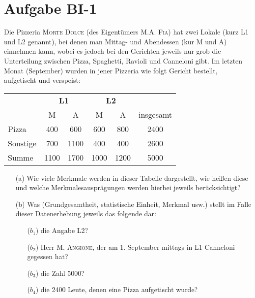 
\section{Aufgabe BI-1}

\begin{task}
    Die Pizzeria \textsc{Morte Dolce} (des Eigentümers \textsc{M.A. Fia}) hat zwei Lokale (kurz L1 und L2 genannt), bei denen man Mittag- und Abendessen (kur M und A) einnehmen kann, wobei es jedoch bei den Gerichten jeweils nur grob die Unterteilung zwischen Pizza, Spaghetti, Ravioli und Canneloni gibt. Im letzten Monat (September) wurden in jener Pizzeria wie folgt Gericht bestellt, aufgetischt und verspeist:

    \begin{table}[H]
    \begin{tabular}{l||cc|cc||c}
        \multirow{2}{*}{} & \multicolumn{2}{c|}{\bf{L1}}  & \multicolumn{2}{c||}{\bf{L2}} &                         \\
                          & \multicolumn{1}{c}{M}         & A    & \multicolumn{1}{c}{M}  & A           & insgesamt \\ \hline\hline
        Pizza             & \multicolumn{1}{c}{400}       & 600  & 600                    & 800         & 2400      \\
        Sonstige          & \multicolumn{1}{c}{700}       & 1100 & 400                    & 400         & 2600      \\
        Summe             & \multicolumn{1}{c}{1100}      & 1700 & 1000                   & 1200        & 5000     
    \end{tabular}
    \end{table}

    \begin{enumerate}
        \item[(a)] Wie viele Merkmale werden in dieser Tabelle dargestellt, wie heißen diese und welche Merkmalesausprägungen werden hierbei jeweils berücksichtigt?
    \end{enumerate}
\end{task}

\begin{task}
    \begin{enumerate}
        \item[(b)] Was (Grundgesamtheit, statistische Einheit, Merkmal usw.) stellt im Falle dieser Datenerhebung jeweils das folgende dar:
        \begin{enumerate}
            \item[($b_1$)] die Angabe L2?
            \item[($b_2$)] Herr \textsc{M. Angione}, der am 1. September mittags in L1 Canneloni gegessen hat?
            \item[($b_3$)] die Zahl 5000?
            \item[($b_4$)] die 2400 Leute, denen eine Pizza aufgetischt wurde?
        \end{enumerate}
    \end{enumerate}
\end{task}
